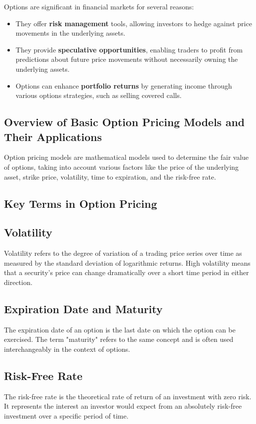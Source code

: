 \documentclass{article}
\begin{document}
Options are significant in financial markets for several reasons:
\begin{itemize}
    \item They offer \textbf{risk management} tools, allowing investors to hedge against price movements in the underlying assets.
    \item They provide \textbf{speculative opportunities}, enabling traders to profit from predictions about future price movements without necessarily owning the underlying assets.
    \item Options can enhance \textbf{portfolio returns} by generating income through various options strategies, such as selling covered calls.
\end{itemize}

\subsection*{Overview of Basic Option Pricing Models and Their Applications}
Option pricing models are mathematical models used to determine the fair value of options, taking into account various factors like the price of the underlying asset, strike price, volatility, time to expiration, and the risk-free rate.

\subsection{Key Terms in Option Pricing}
\subsection*{Volatility}
Volatility refers to the degree of variation of a trading price series over time as measured by the standard deviation of logarithmic returns. High volatility means that a security's price can change dramatically over a short time period in either direction.

\subsection*{Expiration Date and Maturity}
The expiration date of an option is the last date on which the option can be exercised. The term "maturity" refers to the same concept and is often used interchangeably in the context of options.

\subsection*{Risk-Free Rate}
The risk-free rate is the theoretical rate of return of an investment with zero risk. It represents the interest an investor would expect from an absolutely risk-free investment over a specific period of time.
\end{document}
